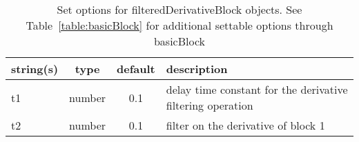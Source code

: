 \begin{table}[ht]
\centering
\begin{tabular}{p{5cm} c c p{7cm}}
\hline
string(s) & type & default & description \\
\hline
t1 & number & 0.1 & delay time constant for the derivative filtering operation\\
t2 & number & 0.1 & filter on the derivative of block 1\\
\hline
\end{tabular}
\caption{Set options for filteredDerivativeBlock objects. See Table~\ref{table:basicBlock} for additional settable options through basicBlock}
\label{table:filteredDerivativeBlock}
\end{table}
